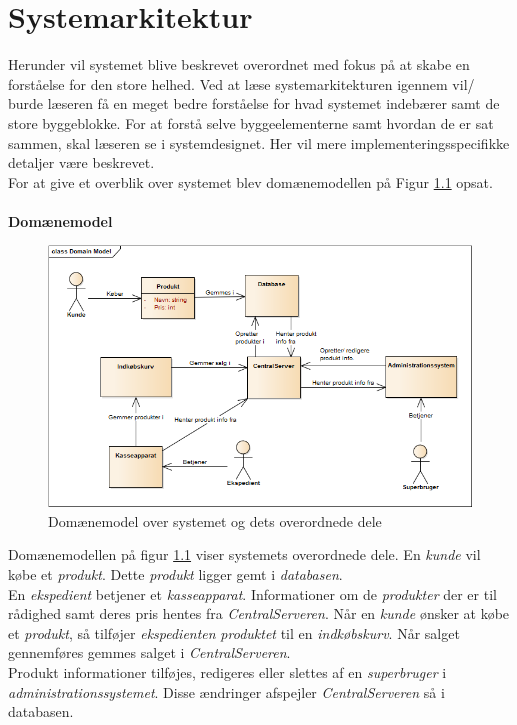 \chapter{Systemarkitektur}

Herunder vil systemet blive beskrevet overordnet med fokus på at skabe en forståelse for den store helhed. Ved at læse systemarkitekturen igennem vil/ burde læseren få en meget bedre forståelse for hvad systemet indebærer samt de store byggeblokke. For at forstå selve byggeelementerne samt hvordan de er sat sammen, skal læseren se i systemdesignet. Her vil mere implementeringsspecifikke detaljer være beskrevet. \\
For at give et overblik over systemet blev domænemodellen på Figur \ref{fig:system_domain} opsat. \\
\\

\textbf{Domænemodel}
\begin{figure}[H]
	\centering
	\includegraphics[scale=0.5]{Systemarkitektur/DomainModel}
	\caption{Domænemodel over systemet og dets overordnede dele}
	\label{fig:system_domain}
\end{figure}

Domænemodellen på figur \ref{fig:system_domain} viser systemets overordnede dele. En \textit{kunde} vil købe et \textit{produkt}. Dette \textit{produkt} ligger gemt i \textit{databasen}. \\ 
En \textit{ekspedient} betjener et \textit{kasseapparat}. Informationer om de \textit{produkter} der er til rådighed samt deres pris hentes fra \textit{CentralServeren}. Når en \textit{kunde} ønsker at købe et \textit{produkt}, så tilføjer \textit{ekspedienten} \textit{produktet}  til en \textit{indkøbskurv}. Når salget gennemføres gemmes salget i \textit{CentralServeren}. \\
Produkt informationer tilføjes, redigeres eller slettes af en \textit{superbruger} i \textit{administrationssystemet}. Disse ændringer afspejler \textit{CentralServeren} så i databasen.

\newpage

%

\newpage
%

\newpage
